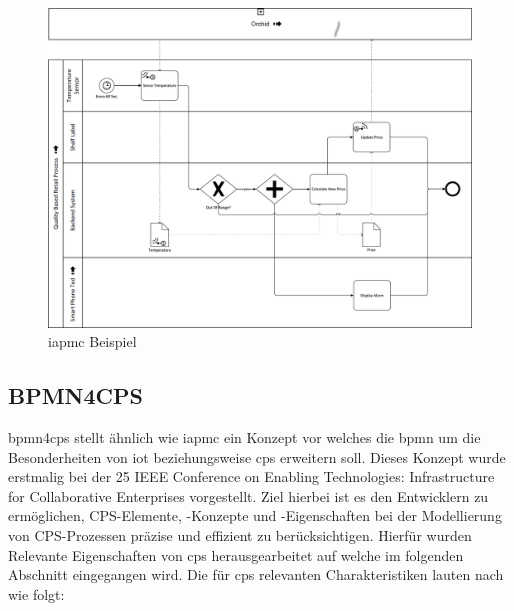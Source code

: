 \documentclass[a4paper, 12pt, twoside, headsepline=true]{scrartcl} %
\begin{document}
\begin{figure}[H]
	\includegraphics[height=12 cm,keepaspectratio,center]{figures/iotaprocess}
	\caption{\ac{iapmc} Beispiel\cite[S.81]{conceptsiotawarepm}}
	\label{fig:iotaprocess}
\end{figure} 

\subsection{BPMN4CPS}

\ac{bpmn4cps} stellt ähnlich wie \ac{iapmc} ein Konzept vor welches die \ac{bpmn} um die Besonderheiten von \ac{iot} beziehungsweise \ac{cps} erweitern soll. Dieses Konzept wurde erstmalig bei der 25 IEEE Conference on Enabling Technologies: Infrastructure for Collaborative Enterprises vorgestellt. Ziel hierbei ist es den Entwicklern zu ermöglichen, CPS-Elemente, -Konzepte und -Eigenschaften bei der Modellierung von CPS-Prozessen präzise und effizient zu berücksichtigen. Hierfür wurden Relevante Eigenschaften von \ac{cps} herausgearbeitet auf welche im folgenden Abschnitt eingegangen wird.
Die für \ac{cps} relevanten Charakteristiken lauten nach \cite{BMPN4CPS} wie folgt:
\end{document}
